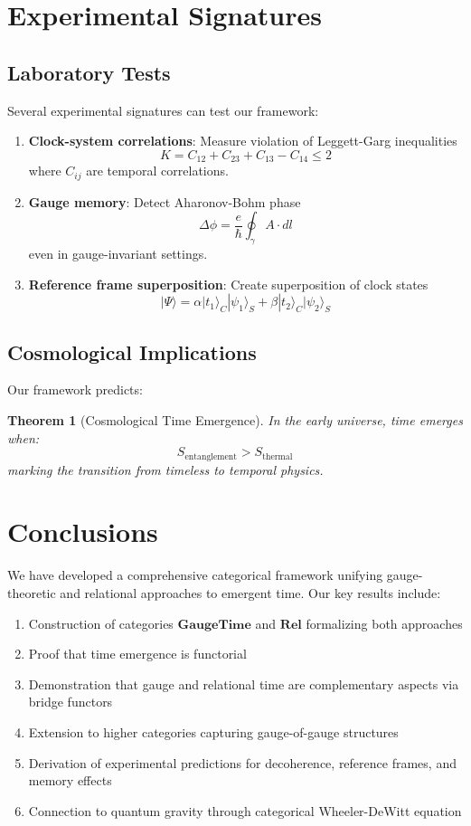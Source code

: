 \documentclass[12pt,a4paper]{article}
\newtheorem{theorem}{Theorem}[section]
\begin{document}
\section{Experimental Signatures}

\subsection{Laboratory Tests}

Several experimental signatures can test our framework:

\begin{enumerate}
\item \textbf{Clock-system correlations}: Measure violation of Leggett-Garg inequalities
\[
K = C_{12} + C_{23} + C_{13} - C_{14} \leq 2
\]
where $C_{ij}$ are temporal correlations.

\item \textbf{Gauge memory}: Detect Aharonov-Bohm phase
\[
\Delta\phi = \frac{e}{\hbar}\oint_\gamma A \cdot dl
\]
even in gauge-invariant settings.

\item \textbf{Reference frame superposition}: Create superposition of clock states
\[
|\Psi\rangle = \alpha|t_1\rangle_C|\psi_1\rangle_S + \beta|t_2\rangle_C|\psi_2\rangle_S
\]
\end{enumerate}

\subsection{Cosmological Implications}

Our framework predicts:

\begin{theorem}[Cosmological Time Emergence]
In the early universe, time emerges when:
\[
S_{\text{entanglement}} > S_{\text{thermal}}
\]
marking the transition from timeless to temporal physics.
\end{theorem}

\section{Conclusions}

We have developed a comprehensive categorical framework unifying gauge-theoretic and relational approaches to emergent time. Our key results include:

\begin{enumerate}
\item Construction of categories $\mathbf{GaugeTime}$ and $\mathbf{Rel}$ formalizing both approaches
\item Proof that time emergence is functorial
\item Demonstration that gauge and relational time are complementary aspects via bridge functors
\item Extension to higher categories capturing gauge-of-gauge structures
\item Derivation of experimental predictions for decoherence, reference frames, and memory effects
\item Connection to quantum gravity through categorical Wheeler-DeWitt equation
\end{enumerate}
\end{document}
